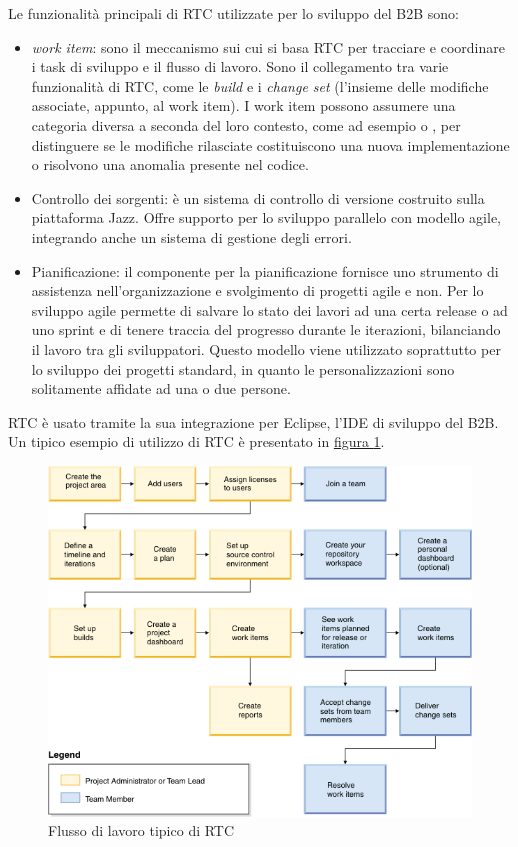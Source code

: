 Le funzionalità principali di RTC utilizzate per lo sviluppo del B2B sono:
\begin{itemize}
	\item \textit{work item}: sono il meccanismo sui cui si basa RTC per tracciare e coordinare i task di sviluppo e il flusso di lavoro. Sono il collegamento tra varie funzionalità di RTC, come le \textit{build} e i \textit{change set} (l'insieme delle modifiche associate, appunto, al work item). I work item possono assumere una categoria diversa a seconda del loro contesto, come ad esempio  o , per distinguere se le modifiche rilasciate costituiscono una nuova implementazione o risolvono una anomalia presente nel codice.
	\item Controllo dei sorgenti: è un sistema di controllo di versione costruito sulla piattaforma Jazz. Offre supporto per lo sviluppo parallelo con modello agile, integrando anche un sistema di gestione degli errori.
	\item Pianificazione: il componente per la pianificazione fornisce uno strumento di assistenza nell'organizzazione e svolgimento di progetti agile e non. Per lo sviluppo agile permette di salvare lo stato dei lavori ad una certa release o ad uno sprint e di tenere traccia del progresso durante le iterazioni, bilanciando il lavoro tra gli sviluppatori. Questo modello viene utilizzato soprattutto per lo sviluppo dei progetti standard, in quanto le personalizzazioni sono solitamente affidate ad una o due persone.
\end{itemize}
RTC è usato tramite la sua integrazione per Eclipse, l'IDE di sviluppo del B2B. Un tipico esempio di utilizzo di RTC è presentato in \hyperref[fig:rtc]{figura \ref{fig:rtc}}.
\begin{figure}[H]
	\centering
	\includegraphics[width=14cm]{Immagini/rtc-task-flow.png}
	\caption{Flusso di lavoro tipico di RTC}
	\label{fig:rtc}
\end{figure}

